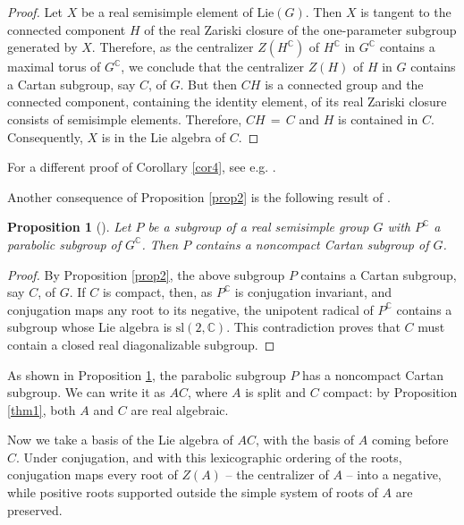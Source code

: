 \documentclass[12pt]{amsart}
\newtheorem{proposition}[theorem]{Proposition}
\begin{document}
\begin{proof}
Let $X$ be a real semisimple element of $\mathrm{Lie}(G)$. Then $X$ is
tangent to the connected component $H$ of the real Zariski closure of the
one-parameter subgroup generated by $X$. Therefore, as the centralizer
$Z(H^{\mathbb{C}})$ of $H^{\mathbb{C}}$ in $G^{\mathbb{C}}$ contains a maximal
torus of $G^{\mathbb{C}}$, we conclude that the centralizer $Z(H)$ of $H$ in
$G$ contains a Cartan subgroup, say $C$, of $G$. But then $CH$ is a
connected group and the connected component, containing the identity
element, of its real Zariski closure consists of semisimple elements.
Therefore, $CH\,=\, C$ and $H$ is contained in $C$. Consequently, $X$ is in
the Lie algebra of $C$.
\end{proof}

For a different proof of Corollary \ref{cor4}, see e.g. \cite[p. 420]{He}.

Another consequence of Proposition \ref{prop2} is the following result of
\cite{Mo}.

\begin{proposition}[\protect\cite{Mo}]
\label{t1} Let $P$ be a subgroup of a real semisimple group $G$ with
$P^{\mathbb{C}}$ a parabolic subgroup of $G^{\mathbb{C}}$. Then $P$ contains a
noncompact Cartan subgroup of $G$.
\end{proposition}

\begin{proof}
By Proposition \ref{prop2}, the above subgroup $P$ contains a Cartan
subgroup, say $C$, of $G$. If $C$ is compact, then, as $P^{\mathbb{C}}$ is
conjugation invariant, and conjugation maps any root to its negative, the
unipotent radical of $P^{\mathbb{C}}$ contains a subgroup whose Lie algebra
is $\text{sl}(2, {\mathbb{C}})$. This contradiction proves that $C$ must
contain a closed real diagonalizable subgroup.
\end{proof}

As shown in Proposition \ref{t1}, the parabolic subgroup
$P$ has a noncompact Cartan subgroup. We can write it
as $AC$, where $A$ is split and $C$ compact: by Proposition \ref{thm1}, both $A$ and
$C$ are real algebraic.

Now we take a basis of the Lie algebra of $AC$, with the basis of $A$ coming
before $C$. Under conjugation, and with this lexicographic ordering of the
roots, conjugation maps every root of $Z(A)$ -- the centralizer of $A$ -- into a
negative, while positive roots supported outside the simple system of roots
of $A$ are preserved.
\end{document}

